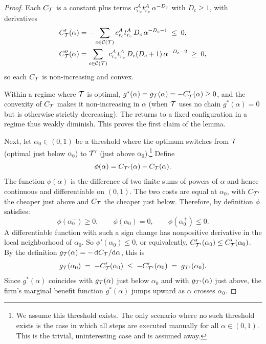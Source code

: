 \begin{proof}
Each $C_{\mathcal{T}}$ is a constant plus terms $c^{A}_{r_c}t^{A}_{r_c}\,\alpha^{-D_c}$ with $D_c \ge 1$, with derivatives
\[
\begin{aligned}
C_{\mathcal{T}}'(\alpha) &= -\sum_{c \in \mathcal{C}(\mathcal{T})} c^{A}_{r_c}t^{A}_{r_c}\,D_c\,\alpha^{-D_c-1} \;\le\; 0, \\
C_{\mathcal{T}}''(\alpha) &= \sum_{c \in \mathcal{C}(\mathcal{T})} c^{A}_{r_c}t^{A}_{r_c}\,D_c(D_c+1)\,\alpha^{-D_c-2} \;\ge\; 0,
\end{aligned}
\]
so each $C_{\mathcal{T}}$ is non-increasing and convex.

Within a regime where $\mathcal{T}$ is optimal, $g^*(\alpha) = g_{\mathcal{T}}(\alpha) = -C_{\mathcal{T}}'(\alpha) \ge 0$, and the convexity of $C_{\mathcal{T}}$ makes it non-increasing in $\alpha$ (when $\mathcal{T}$ uses no chain $g^*(\alpha) = 0$ but is otherwise strictly decreasing).
The returns to a fixed configuration in a regime thus weakly diminish.
This proves the first claim of the lemma.

Next, let $\alpha_0 \in (0,1)$ be a threshold where the optimum switches from $\mathcal{T}$ (optimal just below $\alpha_0$) to $\mathcal{T}'$ (just above $\alpha_0$).\footnote{We assume this threshold exists. The only scenario where no such threshold exists is the case in which all steps are executed manually for all $\alpha \in (0,1)$. This is the trivial, uninteresting case and is assumed away.}
Define
\[
\phi(\alpha) = C_{\mathcal{T}'}(\alpha) - C_{\mathcal{T}}(\alpha).
\]
The function $\phi(\alpha)$ is the difference of two finite sums of powers of $\alpha$ and hence continuous and differentiable on $(0,1)$. 
The two costs are equal at $\alpha_0$, with $C_{\mathcal{T}'}$ the cheaper just above and $C_{\mathcal{T}}$ the cheaper just below.
Therefore, by definition $\phi$ satisfies:
\[
\phi(\alpha_0^{-}) \ge 0,
\qquad
\phi(\alpha_0) = 0,
\qquad
\phi(\alpha_0^{+}) \le 0.
\]
A differentiable function with such a sign change has nonpositive derivative in the local neighborhood of $\alpha_0$.
So $\phi'(\alpha_0) \le 0$, or equivalently, $C_{\mathcal{T}'}'(\alpha_0) \le C_{\mathcal{T}}'(\alpha_0)$.
By the definition $g_{\mathcal{T}}(\alpha) = -\,\mathrm{d}C_{\mathcal{T}}/\mathrm{d}\alpha$, this is
\[
g_{\mathcal{T}}(\alpha_0) \;=\; -C_{\mathcal{T}}'(\alpha_0)
\;\le\;
-C_{\mathcal{T}'}'(\alpha_0) \;=\; g_{\mathcal{T}'}(\alpha_0).
\]
Since $g^*(\alpha)$ coincides with $g_{\mathcal{T}}(\alpha)$ just below $\alpha_0$ and with $g_{\mathcal{T}'}(\alpha)$ just above, the firm's marginal benefit function $g^*(\alpha)$ jumps upward as $\alpha$ crosses $\alpha_0$.
\end{proof}
